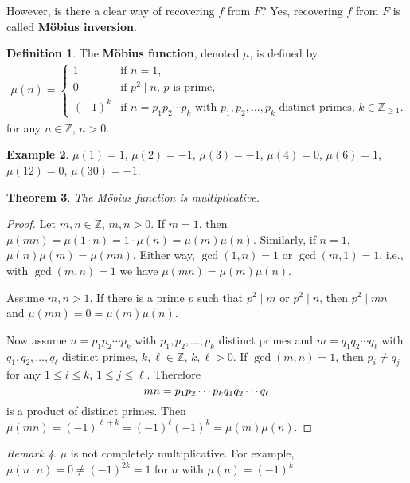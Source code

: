 \documentclass{amsbook}
\theoremstyle{plain}
\newtheorem{theorem}{Theorem}[chapter] %
\theoremstyle{definition}
\newtheorem{definition}[theorem]{Definition}
\newtheorem{example}[theorem]{Example}
\theoremstyle{remark}
\newtheorem{remark}[theorem]{Remark}
\numberwithin{equation}{chapter}
\numberwithin{figure}{chapter}
\newcommand{\Z}{\mathbb{Z}}
\begin{document}
However, is there a clear way of recovering $f$ from $F$? Yes, recovering $f$ from $F$ is called \textbf{M\"obius inversion}.
\begin{definition}
  The \textbf{M\"obius function}, denoted $\mu$, is defined by
  \begin{align}
    \mu (n) = \left\{ \begin{array}{rl}
                        1 & \text{if $n = 1$,} \\[1mm]
                        0 & \text{if $p^2 \mid n$, $p$ is prime,} \\[1mm]
                        (-1)^k & \text{if $n = p_1p_2\cdots p_k$ with $p_1, p_2, \ldots, p_k$ distinct primes, $k \in \Z_{\geqslant 1}$.}
                      \end{array} \right.
  \end{align}
  for any $n \in \Z$, $n > 0$.
\end{definition}
\begin{example}
  $\mu (1) = 1$, $\mu (2) = -1$, $\mu (3) = -1$, $\mu (4) = 0$, $\mu (6) = 1$, $\mu (12) = 0$, $\mu (30) = -1$.
\end{example}
\begin{theorem}
  The M\"obius function is multiplicative.
\end{theorem}
\begin{proof}
  Let $m, n \in \Z$, $m, n > 0$. If $m = 1$, then $\mu (mn) = \mu (1\cdot n) = 1 \cdot \mu (n) = \mu (m) \mu (n)$. Similarly, if $n = 1$, $\mu (n) \mu (m) = \mu (mn)$. Either way, $\gcd (1, n) = 1$ or $\gcd (m, 1) = 1$, i.e., with $\gcd (m, n) = 1$ we have $\mu (mn) = \mu (m) \mu (n)$.

  Assume $m, n > 1$. If there is a prime $p$ such that $p^2 \mid m$ or $p^2 \mid n$, then $p^2 \mid mn$ and $\mu (mn) = 0 = \mu (m) \mu (n)$.

  Now assume $n = p_1 p_2 \cdots p_k$ with $p_1, p_2, \ldots, p_k$ distinct primes and $m = q_1 q_2 \cdots q_{\ell}$ with $q_1, q_2, \ldots, q_{\ell}$ distinct primes, $k, \ell \in \Z$, $k, \ell > 0$. If $\gcd (m, n) = 1$, then $p_i \neq q_j$ for any $1 \leqslant i \leqslant k$, $1 \leqslant j \leqslant \ell$. Therefore
  \[
    mn = p_1 p_2 \cdots p_k q_1 q_2 \cdots q_{\ell} \\
  \]
  is a product of distinct primes. Then $\mu (mn) = (-1)^{\ell+k} = (-1)^{\ell}(-1)^k = \mu (m) \mu (n)$.
\end{proof}
\begin{remark}
  $\mu$ is not completely multiplicative. For example, $\mu (n\cdot n) = 0 \neq (-1)^{2k} = 1$ for $n$ with $\mu (n) = (-1)^k$.
\end{remark}
\end{document}
